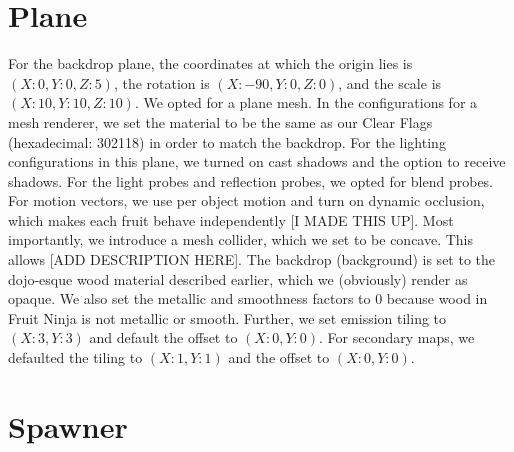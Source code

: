 \section{Plane}
For the backdrop plane, the coordinates at which the origin lies is $(X: 0, Y: 0, Z: 5)$, the rotation is $(X: -90, Y: 0, Z: 0)$, and the scale is $(X: 10, Y: 10, Z: 10)$.
We opted for a plane mesh. In the configurations for a mesh renderer, we set the material to be the same as our Clear Flags (hexadecimal: 302118) in order to match the backdrop.
For the lighting configurations in this plane, we turned on cast shadows and the option to receive shadows. For the light probes and reflection probes, we opted for blend probes.
For motion vectors, we use per object motion and turn on dynamic occlusion, which makes each fruit behave independently [I MADE THIS UP]. Most importantly, we introduce a mesh 
collider, which we set to be concave. This allows [ADD DESCRIPTION HERE]. The backdrop (background) is set to the dojo-esque wood material described earlier, which we (obviously)
render as opaque. We also set the metallic and smoothness factors to $0$ because wood in Fruit Ninja is not metallic or smooth. Further, we set emission tiling to $(X: 3, Y: 3)$ 
and default the offset to $(X: 0, Y: 0)$. For secondary maps, we defaulted the tiling to $(X: 1, Y: 1)$ and the offset to $(X: 0, Y: 0)$.

\section{Spawner}
